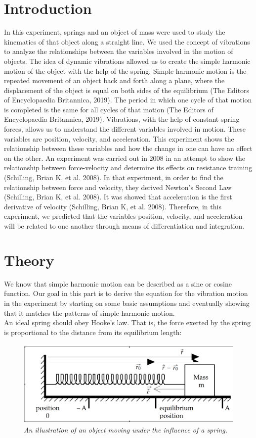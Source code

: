 \documentclass{article}
\begin{document}
\section{Introduction}
In this experiment, springs and an object of mass were used to study the kinematics of that object along a straight line. We used the concept of vibrations to analyze the relationships between the variables involved in the motion of objects. The idea of dynamic vibrations allowed us to create the simple harmonic motion of the object with the help of the spring. Simple harmonic motion is the repeated movement of an object back and forth along a plane, where the displacement of the object is equal on both sides of the equilibrium (The Editors of Encyclopaedia Britannica, 2019). The period in which one cycle of that motion is completed is the same for all cycles of that motion (The Editors of Encyclopaedia Britannica, 2019). Vibrations, with the help of constant spring forces, allows us to understand the different variables involved in motion. These variables are position, velocity, and acceleration. This experiment shows the relationship between these variables and how the change in one can have an effect on the other. An experiment was carried out in 2008 in an attempt to show the relationship between force-velocity and determine its effects on resistance training (Schilling, Brian K, et al. 2008). In that experiment, in order to find the relationship between force and velocity, they derived Newton's Second Law (Schilling, Brian K, et al. 2008). It was showed that acceleration is the first derivative of velocity (Schilling, Brian K, et al. 2008). Therefore, in this experiment, we predicted that the variables position, velocity, and acceleration will be related to one another through means of differentiation and integration.

\section{Theory}
We know that simple harmonic motion can be described as a sine or cosine function. Our goal in this part is to derive the equation for the vibration motion in the experiment by starting on some basic assumptions and eventually showing that it matches the patterns of simple harmonic motion.\\
An ideal spring should obey Hooke's law. That is, the force exerted by the spring is proportional to the distance from its equilibrium length:
\begin{figure}[h!]
\centering
\includegraphics[height=4.2cm]{Figures/figure1.png} 
\caption{\textit{An illustration of an object moving under the influence of a spring.}}
\label{fig:spring and object}
\end{figure}
\end{document}

